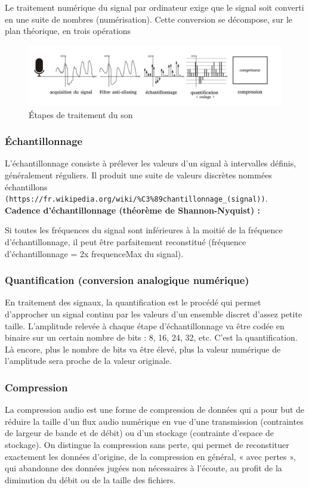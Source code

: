 \documentclass[a4paper, 12pt]{book}
\begin{document}
Le traitement numérique du signal par ordinateur exige que le signal soit converti en une suite de nombres (numérisation). Cette conversion se décompose, sur le plan théorique, en trois opérations

\begin{figure}[htbp]
  \centering
  \includegraphics[width=1.2\linewidth]{fig/etape-acquisition-son.png}
  \caption{Étapes de traitement du son}
\end{figure}

\subsubsection{Échantillonnage}

L'échantillonnage consiste à prélever les valeurs d'un signal à intervalles définis, généralement réguliers. Il produit une suite de valeurs discrètes nommées échantillons \texttt{(https://fr.wikipedia.org/wiki/\%C3\%89chantillonnage\_(signal))}.\\

\textbf{Cadence d'échantillonnage (théorème de Shannon-Nyquist) :}

Si toutes les fréquences du signal sont inférieures à la moitié de la fréquence d'échantillonnage, il peut être parfaitement reconstitué (fréquence d'échantillonnage = 2x frequenceMax du signal).

\subsubsection{Quantification (conversion analogique numérique)}
En traitement des signaux, la quantification est le procédé qui permet d'approcher un signal continu par les valeurs d'un ensemble discret d'assez petite taille. L'amplitude relevée à chaque étape d'échantillonnage va être codée en binaire sur un certain nombre de bits : 8, 16, 24, 32, etc. C'est la quantification. Là encore, plus le nombre de bits va être élevé, plus la valeur numérique de l'amplitude sera proche de la valeur originale.

\subsubsection{Compression}
La compression audio est une forme de compression de données qui a pour but de réduire la taille d'un flux audio numérique en vue d'une transmission (contraintes de largeur de bande et de débit) ou d'un stockage (contrainte d'espace de stockage). On distingue la compression sans perte, qui permet de reconstituer exactement les données d'origine, de la compression en général, « avec pertes », qui abandonne des données jugées non nécessaires à l'écoute, au profit de la diminution du débit ou de la taille des fichiers. 
\end{document}
